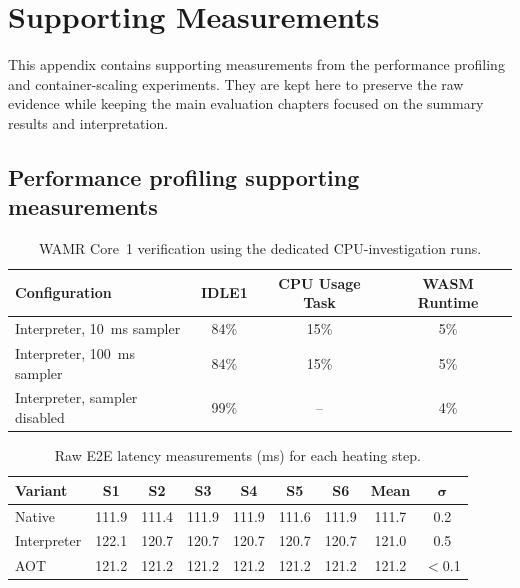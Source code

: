 \documentclass[12pt, a4paper]{report}
\begin{document}



\appendix

\chapter{Supporting Measurements}
\label{app:performance-support}

This appendix contains supporting measurements from the performance profiling and container-scaling experiments. They are kept here to preserve the raw evidence while keeping the main evaluation chapters focused on the summary results and interpretation.

\section{Performance profiling supporting measurements}

\begin{table}[htbp]
\centering
\caption{WAMR Core~1 verification using the dedicated CPU-investigation runs.}
\label{tab:cpu-instrumentation-check}
\small
\begin{tabular}{@{}lccc@{}}
\toprule
\textbf{Configuration} & \textbf{IDLE1} & \textbf{CPU Usage Task} & \textbf{WASM Runtime} \\
\midrule
Interpreter, 10~ms sampler   & 84\% & 15\% & 5\% \\
Interpreter, 100~ms sampler  & 84\% & 15\% & 5\% \\
Interpreter, sampler disabled & 99\% & -- & 4\% \\
\bottomrule
\end{tabular}
\end{table}

\begin{table}[htbp]
\centering
\caption{Raw E2E latency measurements (ms) for each heating step.}
\label{tab:e2e-raw}
\small
\begin{tabular}{@{}lcccccc|cc@{}}
\toprule
\textbf{Variant} & \textbf{S1} & \textbf{S2} & \textbf{S3} & \textbf{S4} & \textbf{S5} & \textbf{S6} & \textbf{Mean} & $\boldsymbol{\sigma}$ \\
\midrule
Native      & 111.9 & 111.4 & 111.9 & 111.9 & 111.6 & 111.9 & 111.7 & 0.2 \\
Interpreter & 122.1 & 120.7 & 120.7 & 120.7 & 120.7 & 120.7 & 121.0 & 0.5 \\
AOT         & 121.2 & 121.2 & 121.2 & 121.2 & 121.2 & 121.2 & 121.2 & $<$0.1 \\
\bottomrule
\end{tabular}
\end{table}
\newpage
\end{document}
